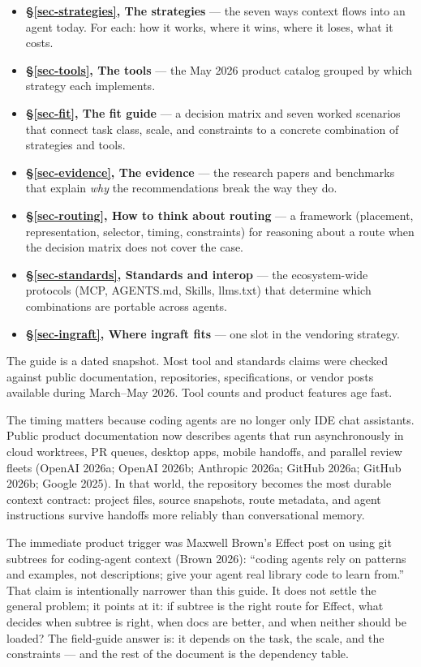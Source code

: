 \documentclass[
  11pt,
  letterpaper,
  numbers=noendperiod,
  parskip=half]{scrartcl}
\providecommand{\tightlist}{%
  \setlength{\itemsep}{0pt}\setlength{\parskip}{0pt}}
\begin{document}
\begin{itemize}
\tightlist
\item
  \textbf{\S\ref{sec-strategies}, The strategies} --- the seven ways
  context flows into an agent today. For each: how it works, where it
  wins, where it loses, what it costs.
\item
  \textbf{\S\ref{sec-tools}, The tools} --- the May 2026 product catalog
  grouped by which strategy each implements.
\item
  \textbf{\S\ref{sec-fit}, The fit guide} --- a decision matrix and
  seven worked scenarios that connect task class, scale, and
  constraints to a concrete combination of strategies and tools.
\item
  \textbf{\S\ref{sec-evidence}, The evidence} --- the research papers
  and benchmarks that explain \emph{why} the recommendations break the
  way they do.
\item
  \textbf{\S\ref{sec-routing}, How to think about routing} --- a
  framework (placement, representation, selector, timing, constraints)
  for reasoning about a route when the decision matrix does not cover
  the case.
\item
  \textbf{\S\ref{sec-standards}, Standards and interop} --- the
  ecosystem-wide protocols (MCP, AGENTS.md, Skills, llms.txt) that
  determine which combinations are portable across agents.
\item
  \textbf{\S\ref{sec-ingraft}, Where ingraft fits} --- one slot in the
  vendoring strategy.
\end{itemize}

The guide is a dated snapshot. Most tool and standards claims were
checked against public documentation, repositories, specifications, or
vendor posts available during March--May 2026. Tool counts and product
features age fast.

The timing matters because coding agents are no longer only IDE chat
assistants. Public product documentation now describes agents that run
asynchronously in cloud worktrees, PR queues, desktop apps, mobile
handoffs, and parallel review fleets (OpenAI 2026a; OpenAI 2026b;
Anthropic 2026a; GitHub 2026a; GitHub 2026b; Google 2025). In that
world, the repository becomes the most durable context contract:
project files, source snapshots, route metadata, and agent instructions
survive handoffs more reliably than conversational memory.

The immediate product trigger was Maxwell Brown's Effect post on using
git subtrees for coding-agent context (Brown 2026): ``coding agents
rely on patterns and examples, not descriptions; give your agent real
library code to learn from.'' That claim is intentionally narrower than
this guide. It does not settle the general problem; it points at it: if
subtree is the right route for Effect, what decides when subtree is
right, when docs are better, and when neither should be loaded? The
field-guide answer is: it depends on the task, the scale, and the
constraints --- and the rest of the document is the dependency table.
\end{document}
